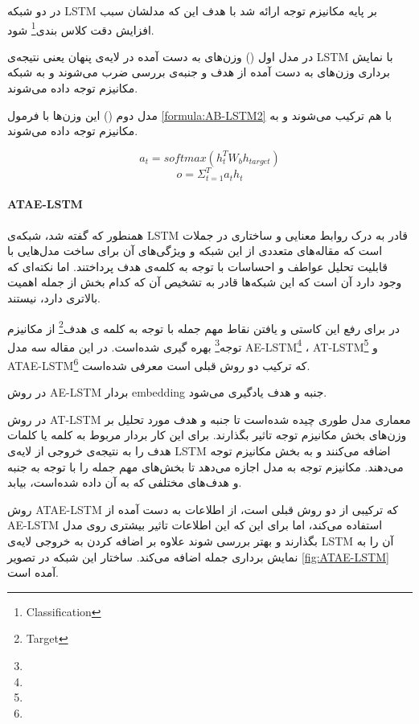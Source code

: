 \documentclass[12pt, a4paper, oneside]{report}
\begin{document}
در
\cite{74YANGATT}
دو شبکه
LSTM
بر پایه مکانیزم توجه ارائه شد با هدف این که مدلشان سبب افزایش دقت کلاس بندی\footnote{Classification}
شود.

در مدل اول
()
وزن‌های به دست آمده در لایه‌ی پنهان یعنی نتیجه‌ی
LSTM
با نمایش برداری وزن‌های به دست آمده از هدف و جنبه‌ی بررسی ضرب می‌شوند و به شبکه
مکانیزم توجه داده می‌شوند.

مدل دوم 
()
این وزن‌ها با فرمول 
\ref{formula:AB-LSTM2}
با هم ترکیب می‌شوند و به مکانیزم توجه داده می‌شوند.

\begin{equation}
    a_t=softmax(h_t^TW_bh_{target})
\end{equation}
\begin{equation}
    o={\Sigma_{t=1}^T a_th_t }
    \label{formula:AB-LSTM2}
\end{equation}



\paragraph{ATAE-LSTM} \hfill \break

همنطور که گفته شد، شبکه‌ی
LSTM
قادر به درک روابط معنایی و ساختاری در جملات است که مقاله‌های متعددی از این شبکه و ویژگی‌های آن برای
ساخت مدل‌هایی با قابلیت تحلیل عواطف و احساسات با توجه به کلمه‌ی هدف پرداختند. اما نکته‌ای که وجود دارد آن است
که این شبکه‌ها قادر به تشخیص آن که کدام بخش از جمله اهمیت بالاتری دارد، نیستند.

در
\cite{73wang-etal-2016-attention}
برای رفع این کاستی و یافتن نقاط مهم جمله با توجه به کلمه ی هدف\footnote{Target}
از مکانیزم توجه\footnote{}
بهره گیری شده‌است. در این مقاله سه مدل
AE-LSTM\footnote{}
،
AT-LSTM\footnote{}
و
ATAE-LSTM\footnote{}
که ترکیب دو روش قبلی است معرفی شده‌است.

در روش
AE-LSTM
بردار
embedding
جنبه و هدف یادگیری می‌شود.

در روش
AT-LSTM
معماری مدل طوری چیده شده‌است تا جنبه و هدف مورد تحلیل بر وزن‌های بخش مکانیزم توجه تاثیر بگذارند. برای این
کار بردار مربوط به کلمه یا کلمات هدف را به نتیجه‌ی خروجی از لایه‌ی
LSTM
اضافه می‌کنند و به بخش مکانیزم توجه می‌دهند. مکانیزم توجه به مدل اجازه می‌دهد تا بخش‌های مهم جمله را
با توجه به جنبه و هدف‌های مختلفی که به آن داده شده‌است، بیابد.

روش
ATAE-LSTM
که ترکیبی از دو روش قبلی است، از اطلاعات به دست آمده از
AE-LSTM
استفاده می‌کند، اما برای این که این اطلاعات تاثیر بیشتری روی مدل بگذارند و بهتر بررسی شوند علاوه بر
اضافه کردن به خروجی لایه‌ی
LSTM
آن را به نمایش برداری جمله اضافه می‌کند. ساختار این شبکه در تصویر
\ref{fig:ATAE-LSTM}
آمده است.
\end{document}
